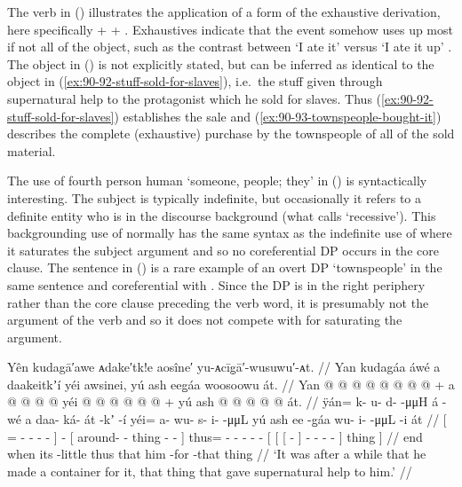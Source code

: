 The verb in (\lastx) illustrates the application of a form of the exhaustive derivation, here specifically  +  + .
Exhaustives indicate that the event somehow uses up most if not all of the object, such as the contrast between  ‘I ate it’ versus  ‘I ate it up’ \parencite[see][219]{leer:1991}.
The object in (\lastx) is not explicitly stated, but can be inferred as identical to the object in (\ref{ex:90-92-stuff-sold-for-slaves}), i.e.\ the stuff given through supernatural help to the protagonist which he sold for slaves.
Thus (\ref{ex:90-92-stuff-sold-for-slaves}) establishes the sale and (\ref{ex:90-93-townspeople-bought-it}) describes the complete (exhaustive) purchase by the townspeople of all of the sold material.

The use of fourth person human  ‘someone, people; they’ in (\lastx) is syntactically interesting.
The  subject is typically indefinite, but occasionally it refers to a definite entity who is in the discourse background (what \cite{leer:1991} calls ‘recessive’).
This backgrounding use of  normally has the same syntax as the indefinite use of  where it saturates the subject argument and so no coreferential DP occurs in the core clause.
The sentence in (\lastx) is a rare example of an overt DP  ‘townspeople’ in the same sentence and coreferential with .
Since the DP is in the right periphery rather than the core clause preceding the verb word, it is presumably not the argument of the verb and so it does not compete with  for saturating the argument.

\ex\label{ex:90-94-made-a-container}%
%
\begingl
	\glpreamble	Yên kudagā′awe ᴀdake′tk!e aosîne′ yu-ᴀcīg̣ā′-wusuwu′-ᴀt. //
	\glpreamble	Yan kudagáa áwé a daakeitkʼí yéi awsinei, yú ash eeg̱áa woosoowu át. //
	\gla	{} Yan @  @ {} @ {} @ {} @ {} @ {} @ {} {}
		 @ {} +
		{} a  @ {} @ {} @ {} @ {} {}
		yéi @  @ {} @ {} @ {} @ {} @ {} +
		{} yú {} {} ash  @ {} {}
				 @ {} @ {} @ {} @ {} {} át. {} //
	\glb	{} ÿán= k- u- {} d-  -μμH {} {}
		á -wé
		{} a daa- ká- át -kʼ -í {}
		yéi= a- wu- s- i-  -μμL
		{} yú {} {} ash ee -g̱áa {}
			wu- i-  -μμL -i {} át {} //
	\glc	{}[ = - - \· -  - \· {}]
		 -
		{}[  around- - thing - - {}]
		thus= - - - -  -
		{}[  {}[ {}[   - {}]
				- -  - - {}] thing {}] //
	\gld	{} end  {} {} {} {} {} \·when {}
		 {}
		{} its  {} {} -little {} {}
		thus  {} {} {} {} {}
		{} that {} {} him {} -for {}
				 {} {} {} -that {} thing {} //
	\glft	‘It was after a while that he made a container for it, that thing that gave supernatural help to him.’
		//
\endgl
\xe


